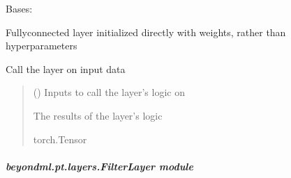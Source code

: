\documentclass[letterpaper,10pt,english]{sphinxmanual}
\begin{document}
\begin{fulllineitems}
\label{\detokenize{beyondml.pt.layers:beyondml.pt.layers.Dense.Dense}}
\pysigstartsignatures
{}
\pysigstopsignatures
\sphinxAtStartPar
Bases: 

\sphinxAtStartPar
Fully\sphinxhyphen{}connected layer initialized directly with weights, rather than hyperparameters

\begin{fulllineitems}
\label{\detokenize{beyondml.pt.layers:beyondml.pt.layers.Dense.Dense.forward}}
\pysigstartsignatures
{}
\pysigstopsignatures
\sphinxAtStartPar
Call the layer on input data
\begin{quote}\begin{description}
\sphinxAtStartPar
{} () \textendash{} Inputs to call the layer’s logic on

\sphinxAtStartPar
{} \textendash{} The results of the layer’s logic

\sphinxAtStartPar
torch.Tensor

\end{description}\end{quote}

\end{fulllineitems}


\end{fulllineitems}



\subparagraph{beyondml.pt.layers.FilterLayer module}
\label{\detokenize{beyondml.pt.layers:module-beyondml.pt.layers.FilterLayer}}\label{\detokenize{beyondml.pt.layers:beyondml-pt-layers-filterlayer-module}}
\end{document}
